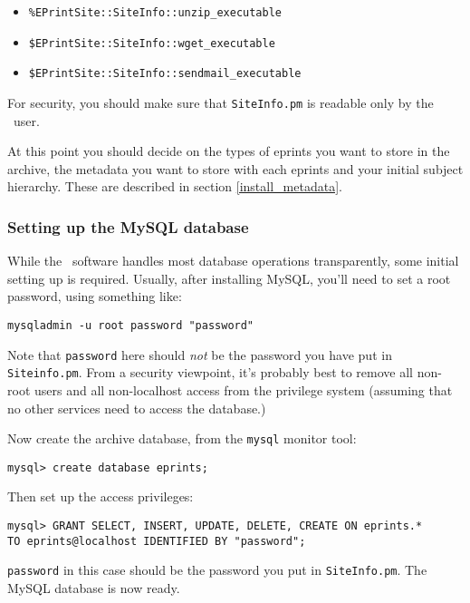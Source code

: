 \begin{itemize}
\item {\tt \%EPrintSite::SiteInfo::unzip\_executable}
\item {\tt \$EPrintSite::SiteInfo::wget\_executable}
\item {\tt \$EPrintSite::SiteInfo::sendmail\_executable}
\end{itemize}

For security, you should make sure that {\tt SiteInfo.pm} is readable only by the \eprints\ user.

At this point you should decide on the types of eprints you want to store in the archive, the metadata you want to store with each eprints and your initial subject hierarchy. These are described in section \ref{install_metadata}.


\subsubsection{Setting up the MySQL database}
\label{manual_create_db}

While the \eprints\ software handles most database operations transparently, some initial setting up is required. Usually, after installing MySQL, you'll need to set a root password, using something like:

\begin{verbatim}
mysqladmin -u root password "password"
\end{verbatim}

Note that {\tt password} here should \emph{not} be the password you have put in {\tt Siteinfo.pm}. From a security viewpoint, it's probably best to remove all non-root users and all non-localhost access from the privilege system (assuming that no other services need to access the database.)

Now create the archive database, from the {\tt mysql} monitor tool:

\begin{verbatim}
mysql> create database eprints;
\end{verbatim}

Then set up the access privileges:

\begin{verbatim}
mysql> GRANT SELECT, INSERT, UPDATE, DELETE, CREATE ON eprints.*
TO eprints@localhost IDENTIFIED BY "password";
\end{verbatim}

{\tt password} in this case should be the password you put in {\tt SiteInfo.pm}. The MySQL database is now ready.


